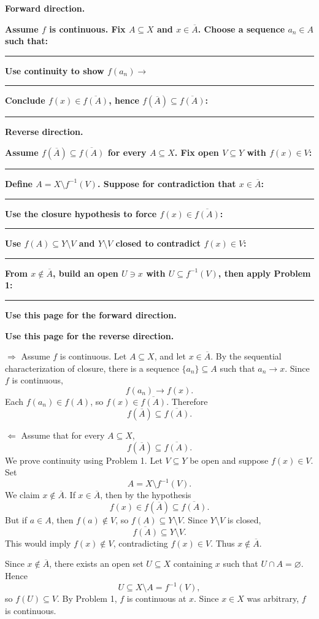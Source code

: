 \documentclass[12pt]{article}
\newcommand{\closure}[1]{\overline{#1}}
\newcommand{\writespace}[1]{\vspace*{#1}}
\newcommand{\workquestion}[2]{%
  \par\noindent\textbf{#1}\par
  \writespace{#2}
  \noindent\rule{\linewidth}{0.35pt}\par\vspace{0.18in}%
}
\newenvironment{skeletonbox}[1]{%
  \begin{tcolorbox}[
    enhanced,
    breakable,
    colback=pass4purple,
    colframe=purple!55!black,
    fonttitle=\bfseries,
    title={Pass 4 -- Skeleton Proof\hfill #1}
  ]
}{%
  \end{tcolorbox}
}
\newcommand{\fullproofpage}[2]{%
  \begin{tcolorbox}[
    enhanced,
    colback=white,
    colframe=gray!60!black,
    fonttitle=\bfseries,
    title={Pass 5 -- Full Proof Attempt\hfill #1},
    height=8.45in
  ]
  \textbf{#2}

  \writespace{7.65in}
  \end{tcolorbox}
}
\newenvironment{solutionbox}[1]{%
  \begin{tcolorbox}[
    enhanced,
    breakable,
    colback=solgreen,
    colframe=green!45!black,
    fonttitle=\bfseries,
    title={#1}
  ]
}{%
  \end{tcolorbox}
}
\begin{document}
\newpage
\begin{skeletonbox}{Homework 12, Problem 2}
\textbf{Forward direction.}
\workquestion{Assume \(f\) is continuous. Fix \(A\subseteq X\) and \(x\in\closure{A}\). Choose a sequence \(a_n\in A\) such that:}{0.95in}
\workquestion{Use continuity to show \(f(a_n)\to\)}{0.75in}
\workquestion{Conclude \(f(x)\in\closure{f(A)}\), hence \(f(\closure{A})\subseteq\closure{f(A)}\):}{0.9in}

\textbf{Reverse direction.}
\workquestion{Assume \(f(\closure{A})\subseteq\closure{f(A)}\) for every \(A\subseteq X\). Fix open \(V\subseteq Y\) with \(f(x)\in V\):}{0.85in}
\workquestion{Define \(A=X\setminus f^{-1}(V)\). Suppose for contradiction that \(x\in\closure{A}\):}{0.9in}
\workquestion{Use the closure hypothesis to force \(f(x)\in\closure{f(A)}\):}{0.8in}
\workquestion{Use \(f(A)\subseteq Y\setminus V\) and \(Y\setminus V\) closed to contradict \(f(x)\in V\):}{0.9in}
\workquestion{From \(x\notin\closure{A}\), build an open \(U\ni x\) with \(U\subseteq f^{-1}(V)\), then apply Problem 1:}{0.95in}
\end{skeletonbox}

\newpage
\fullproofpage{Homework 12, Problem 2}{Use this page for the forward direction.}

\newpage
\fullproofpage{Homework 12, Problem 2}{Use this page for the reverse direction.}

\newpage
\begin{solutionbox}{Student-Derived Solution (No official solution available yet)}
\(\Rightarrow\) Assume \(f\) is continuous. Let \(A\subseteq X\), and let \(x\in\closure{A}\). By the sequential characterization of closure, there is a sequence \(\{a_n\}\subseteq A\) such that \(a_n\to x\). Since \(f\) is continuous,
\[
  f(a_n)\to f(x).
\]
Each \(f(a_n)\in f(A)\), so \(f(x)\in\closure{f(A)}\). Therefore
\[
  f(\closure{A})\subseteq\closure{f(A)}.
\]

\(\Leftarrow\) Assume that for every \(A\subseteq X\),
\[
  f(\closure{A})\subseteq\closure{f(A)}.
\]
We prove continuity using Problem 1. Let \(V\subseteq Y\) be open and suppose \(f(x)\in V\). Set
\[
  A=X\setminus f^{-1}(V).
\]
We claim \(x\notin\closure{A}\). If \(x\in\closure{A}\), then by the hypothesis
\[
  f(x)\in f(\closure{A})\subseteq\closure{f(A)}.
\]
But if \(a\in A\), then \(f(a)\notin V\), so \(f(A)\subseteq Y\setminus V\). Since \(Y\setminus V\) is closed,
\[
  \closure{f(A)}\subseteq Y\setminus V.
\]
This would imply \(f(x)\notin V\), contradicting \(f(x)\in V\). Thus \(x\notin\closure{A}\).

Since \(x\notin\closure{A}\), there exists an open set \(U\subseteq X\) containing \(x\) such that \(U\cap A=\varnothing\). Hence
\[
  U\subseteq X\setminus A=f^{-1}(V),
\]
so \(f(U)\subseteq V\). By Problem 1, \(f\) is continuous at \(x\). Since \(x\in X\) was arbitrary, \(f\) is continuous.
\end{solutionbox}
\end{document}
